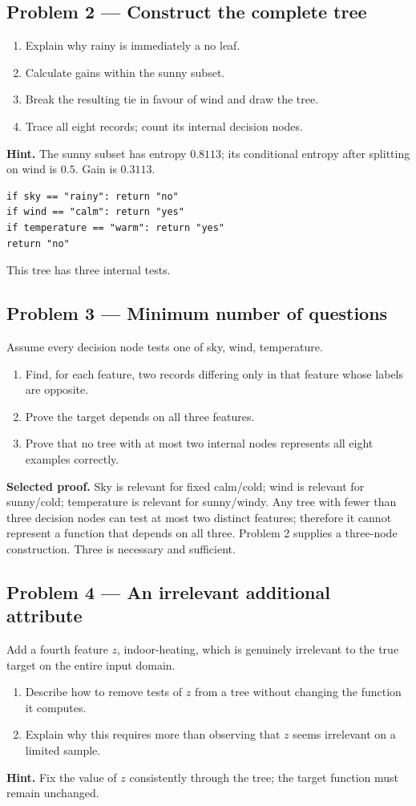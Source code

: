 \documentclass[11pt,a4paper]{article}
\newcommand{\problem}[1]{\subsection*{Problem #1}}
\begin{document}
\problem{2 --- Construct the complete tree}
\begin{enumerate}[label=(\alph*)]
\item Explain why rainy is immediately a no leaf.
\item Calculate gains within the sunny subset.
\item Break the resulting tie in favour of wind and draw the tree.
\item Trace all eight records; count its internal decision nodes.
\end{enumerate}
\textbf{Hint.} The sunny subset has entropy $0.8113$; its conditional entropy after splitting on wind is $0.5$. Gain is $0.3113$.
\begin{verbatim}
if sky == "rainy": return "no"
if wind == "calm": return "yes"
if temperature == "warm": return "yes"
return "no"
\end{verbatim}
This tree has three internal tests.

\problem{3 --- Minimum number of questions}
Assume every decision node tests one of sky, wind, temperature.
\begin{enumerate}[label=(\alph*)]
\item Find, for each feature, two records differing only in that feature whose labels are opposite.
\item Prove the target depends on all three features.
\item Prove that no tree with at most two internal nodes represents all eight examples correctly.
\end{enumerate}
\textbf{Selected proof.} Sky is relevant for fixed calm/cold; wind is relevant for sunny/cold; temperature is relevant for sunny/windy. Any tree with fewer than three decision nodes can test at most two distinct features; therefore it cannot represent a function that depends on all three. Problem 2 supplies a three-node construction. Three is necessary and sufficient.

\problem{4 --- An irrelevant additional attribute}
Add a fourth feature $z$, indoor-heating, which is genuinely irrelevant to the true target on the entire input domain.
\begin{enumerate}[label=(\alph*)]
\item Describe how to remove tests of $z$ from a tree without changing the function it computes.
\item Explain why this requires more than observing that $z$ seems irrelevant on a limited sample.
\end{enumerate}
\textbf{Hint.} Fix the value of $z$ consistently through the tree; the target function must remain unchanged.
\end{document}
